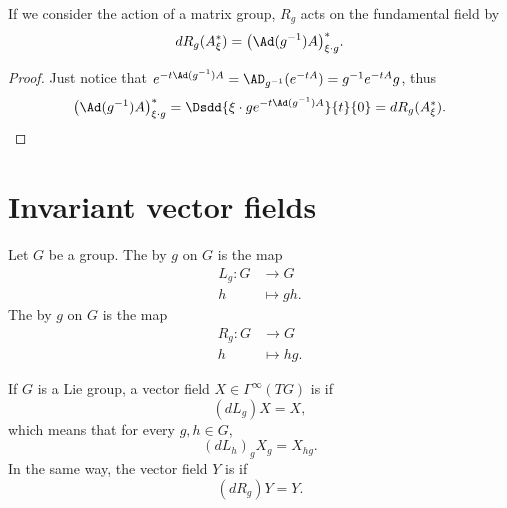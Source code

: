 \begin{lemma}
If we consider the action of a matrix group, $R_g$ acts on the fundamental field by
\[
  dR_g(A^*_{\xi})=\big( \Ad(g^{-1})A \big)^*_{\xi\cdot g}.
\]
\label{lem:dRgAstar}
\end{lemma}

\begin{proof}
Just notice that $e^{-t\Ad(g^{-1})A}=\AD_{g^{-1}}(e^{-tA})=g^{-1} e^{-tA}g$, thus
\begin{equation}
  \big( \Ad(g^{-1})A \big)^*_{\xi\cdot g}=\Dsdd{ \xi\cdot ge^{-t\Ad(g^{-1})A} }{t}{0}=dR_g(A^*_{\xi}).
\end{equation}
\end{proof}

\section{Invariant vector fields}

\begin{definition}
    Let \( G\) be a group. The  by \( g\) on \( G\) is the map
    \begin{equation}
        \begin{aligned}
            L_g\colon G&\to G \\
            h&\mapsto gh. 
        \end{aligned}
    \end{equation}
    The  by \( g\) on \( G\) is the map
    \begin{equation}
        \begin{aligned}
            R_g\colon G&\to G \\
            h&\mapsto hg. 
        \end{aligned}
    \end{equation}
\end{definition}

\begin{definition}        \label{DEFooYHKXooVoJalX}
    If $G$ is a Lie group, a vector field $X\in\Gamma^{\infty}(TG)$ is  if
    \begin{equation}
        (dL_g) X= X,
    \end{equation}
    which means that for every \( g,h\in G\),
    \begin{equation}
        (dL_h)_gX_g=X_{hg}.
    \end{equation}
    In the same way, the vector field \( Y\) is  if
    \begin{equation}
        (dR_g)Y=Y.
    \end{equation}
\end{definition}

